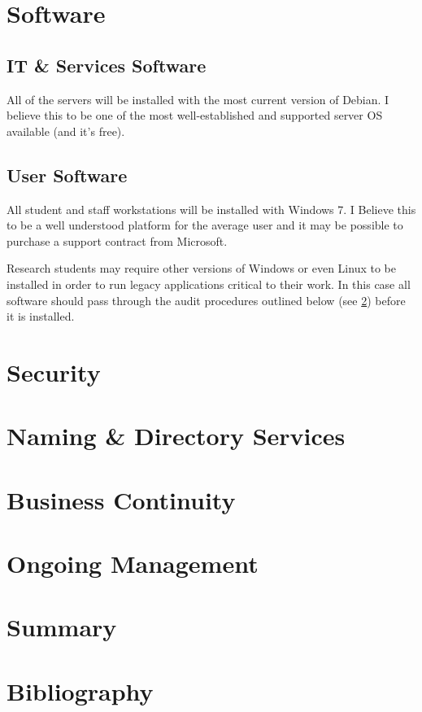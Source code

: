 \documentclass[a4paper, twoside]{article}
\begin{document}
\section{Software}
\subsection{IT \& Services Software}
All of the servers will be installed with the most current version of Debian. I
believe this to be one of the most well-established and supported server OS
available (and it's free).


\subsection{User Software}
All student and staff workstations will be installed with Windows 7. I Believe
this to be a well understood platform for the average user and it may be
possible to purchase a support contract from Microsoft.

Research students may require other versions of Windows or even Linux to be
installed in order to run legacy applications critical to their work. In this
case all software should pass through the audit procedures outlined below (see
\ref{sec:security}) before it is installed.


\section{Security}
\label{sec:security}

\section{Naming \& Directory Services}

\section{Business Continuity}

\section{Ongoing Management}

\section{Summary}

\section{Bibliography}
\end{document}
